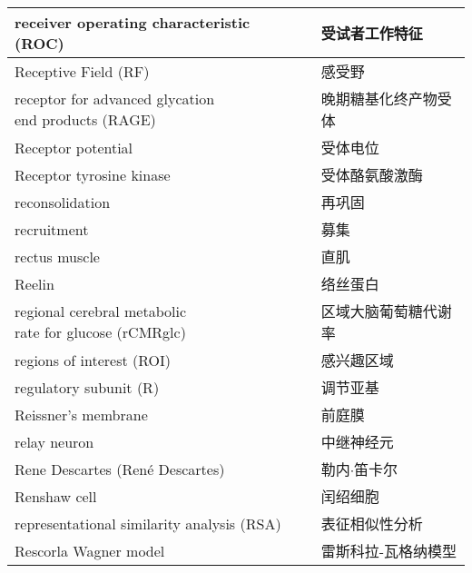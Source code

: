 \begin{longtable}{lll}
	\midrule
	receiver operating characteristic (ROC)   && 受试者工作特征  \\
	
	\midrule
	Receptive Field (RF)   && 感受野  \\
	
	\midrule
	\makecell[l]{receptor for advanced glycation \\end products (RAGE)}   && 晚期糖基化终产物受体  \\
	
	\midrule
	Receptor potential   && 受体电位  \\
	
	\midrule
	Receptor tyrosine kinase   && 受体酪氨酸激酶  \\
	
	\midrule
	reconsolidation   && 再巩固  \\
	
	\midrule
	recruitment   && 募集  \\
	
	\midrule
	rectus muscle   && 直肌  \\
	
	\midrule
	Reelin   && 络丝蛋白  \\
	
	\midrule
	\makecell[l]{regional cerebral metabolic \\rate for glucose (rCMRglc)}  && 区域大脑葡萄糖代谢率  \\
	
	\midrule
	regions of interest (ROI)   && 感兴趣区域  \\
	
	\midrule
	regulatory subunit (R)   && 调节亚基  \\
	
	\midrule
	Reissner’s membrane   && 前庭膜  \\
	
	\midrule
	relay neuron   && 中继神经元  \\
	
	\midrule
	Rene Descartes (René Descartes)  && 勒内$\cdot$笛卡尔  \\
	
	\midrule
	Renshaw cell   && 闰绍细胞  \\
	
	\midrule
	representational similarity analysis (RSA)  && 表征相似性分析  \\
	
	\midrule
	Rescorla Wagner model   && 雷斯科拉-瓦格纳模型  \\
	

\end{longtable}
